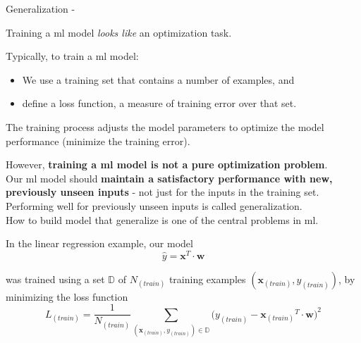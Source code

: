 \begin{frame}[t,allowframebreaks]{Generalization -}

    Training a \gls{ml} model {\em looks like} an optimization task.\\
    \vspace{0.1cm}
    \begin{blockexample}{}
      Typically, to train a \gls{ml} model: 
      \begin{itemize}
        \item 
        We use a \gls{training set} 
        that contains a number of examples, and
        \item
        define a \gls{loss function},
        a measure of training error over that set.
      \end{itemize}
      The training process adjusts the model parameters
      to optimize the model performance (minimize the training error).\\
    \end{blockexample}
    \vspace{0.2cm}
    However, {\bf training a \gls{ml} model is not a pure optimization problem}.\\
    \vspace{0.2cm}
    Our \gls{ml} model should {\bf maintain a satisfactory performance 
    with new, previously unseen inputs} - 
    not just for the inputs in the training set.\\
    \vspace{0.2cm}
    Performing well for previously unseen inputs is called 
    \gls{generalization}.\\
    \vspace{0.2cm}
    How to build model that generalize is one of the central problems in \gls{ml}.


    \framebreak


    In the linear regression example, our model
    \begin{equation}
        \hat{y} = {\mathbf x}^T \cdot {\mathbf w}
    \end{equation}        

    was trained using a set $\mathbb{D}$ of $N_{(train)}$
    training examples $({\mathbf x_{(train)}},y_{(train)})$, 
    by minimizing the loss function
    \begin{equation}
        L_{(train)} = \frac{1}{N_{(train)}} 
        \sum_{({\mathbf x_{(train)}},y_{(train)})  \in \mathbb{D}}
        \Big( y_{(train)} - {\mathbf x_{(train)}}^T \cdot {\mathbf w} \Big)^2
    \end{equation}        


\end{frame}
